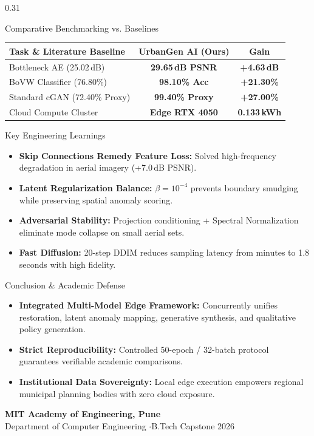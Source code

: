 \documentclass[final]{beamer}
\begin{document}
\begin{frame}[t]
\begin{columns}[t]
\begin{column}{0.31\textwidth}
    \begin{block}{Comparative Benchmarking vs. Baselines}
      \centering
      \small
      \begin{tabularx}{\columnwidth}{@{}X c c@{}}
        \toprule
        \textbf{Task \& Literature Baseline} & \textbf{UrbanGen AI (Ours)} & \textbf{Gain} \\
        \midrule
        Bottleneck AE (25.02\,dB) & \textbf{29.65\,dB PSNR} & \textbf{+4.63\,dB} \\
        BoVW Classifier (76.80\%) & \textbf{98.10\% Acc} & \textbf{+21.30\%} \\
        Standard cGAN (72.40\% Proxy) & \textbf{99.40\% Proxy} & \textbf{+27.00\%} \\
        Cloud Compute Cluster & \textbf{Edge RTX 4050} & \textbf{0.133\,kWh} \\
        \bottomrule
      \end{tabularx}
    \end{block}

    \begin{block}{Key Engineering Learnings}
      \begin{itemize}
        \item \textbf{Skip Connections Remedy Feature Loss:} Solved high-frequency degradation in aerial imagery (+7.0\,dB PSNR).
        \item \textbf{Latent Regularization Balance:} $\beta=10^{-4}$ prevents boundary smudging while preserving spatial anomaly scoring.
        \item \textbf{Adversarial Stability:} Projection conditioning + Spectral Normalization eliminate mode collapse on small aerial sets.
        \item \textbf{Fast Diffusion:} 20-step DDIM reduces sampling latency from minutes to 1.8 seconds with high fidelity.
      \end{itemize}
    \end{block}

    \begin{block}{Conclusion \& Academic Defense}
      \begin{itemize}
        \item \textbf{Integrated Multi-Model Edge Framework:} Concurrently unifies restoration, latent anomaly mapping, generative synthesis, and qualitative policy generation.
        \item \textbf{Strict Reproducibility:} Controlled 50-epoch / 32-batch protocol guarantees verifiable academic comparisons.
        \item \textbf{Institutional Data Sovereignty:} Local edge execution empowers regional municipal planning bodies with zero cloud exposure.
      \end{itemize}
      \vskip0.5cm
      \centering
      \textbf{MIT Academy of Engineering, Pune} \\
      \small Department of Computer Engineering \quad$\cdot$\quad B.Tech Capstone 2026
    \end{block}


\end{column}
\end{columns}
\end{frame}
\end{document}
